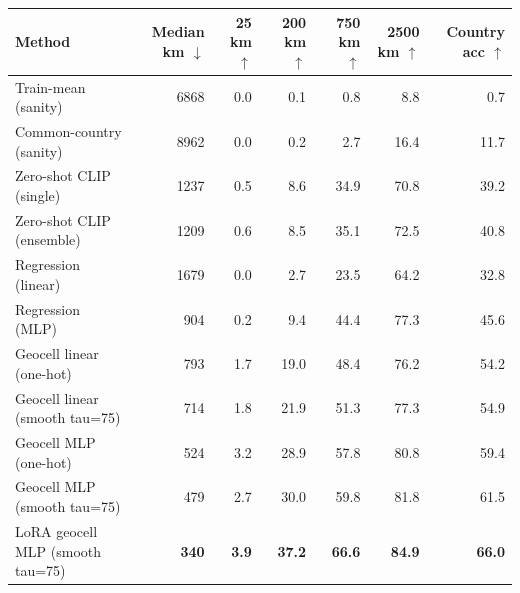 \begin{tabular}{lrrrrrr}
\toprule
Method & Median km $\downarrow$ & 25 km $\uparrow$ & 200 km $\uparrow$ & 750 km $\uparrow$ & 2500 km $\uparrow$ & Country acc $\uparrow$ \\
\midrule
Train-mean (sanity) & 6868 & 0.0 & 0.1 & 0.8 & 8.8 & 0.7 \\
Common-country (sanity) & 8962 & 0.0 & 0.2 & 2.7 & 16.4 & 11.7 \\
Zero-shot CLIP (single) & 1237 & 0.5 & 8.6 & 34.9 & 70.8 & 39.2 \\
Zero-shot CLIP (ensemble) & 1209 & 0.6 & 8.5 & 35.1 & 72.5 & 40.8 \\
Regression (linear) & 1679 & 0.0 & 2.7 & 23.5 & 64.2 & 32.8 \\
Regression (MLP) & 904 & 0.2 & 9.4 & 44.4 & 77.3 & 45.6 \\
Geocell linear (one-hot) & 793 & 1.7 & 19.0 & 48.4 & 76.2 & 54.2 \\
Geocell linear (smooth tau=75) & 714 & 1.8 & 21.9 & 51.3 & 77.3 & 54.9 \\
Geocell MLP (one-hot) & 524 & 3.2 & 28.9 & 57.8 & 80.8 & 59.4 \\
Geocell MLP (smooth tau=75) & 479 & 2.7 & 30.0 & 59.8 & 81.8 & 61.5 \\
LoRA geocell MLP (smooth tau=75) & \textbf{340} & \textbf{3.9} & \textbf{37.2} & \textbf{66.6} & \textbf{84.9} & \textbf{66.0} \\
\bottomrule
\end{tabular}

